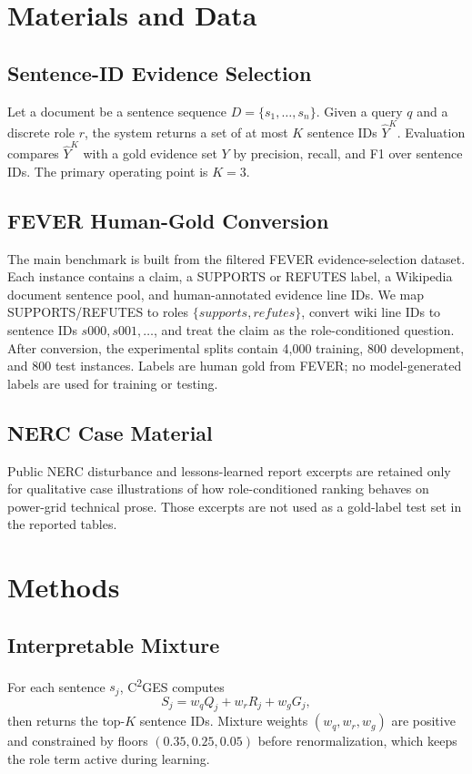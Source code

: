 \documentclass[applsci,article,submit,moreauthors]{Definitions/mdpi}
\newcommand{\cges}{C\textsuperscript{2}GES}
\begin{document}
\section{Materials and Data}
\label{sec:task_benchmark}

\subsection{Sentence-ID Evidence Selection}
Let a document be a sentence sequence $D=\{s_1,\ldots,s_n\}$. Given a query $q$ and a discrete role $r$, the system returns a set of at most $K$ sentence IDs $\hat{Y}^{K}$. Evaluation compares $\hat{Y}^{K}$ with a gold evidence set $Y$ by precision, recall, and F1 over sentence IDs. The primary operating point is $K=3$.

\subsection{FEVER Human-Gold Conversion}
The main benchmark is built from the filtered FEVER evidence-selection dataset. Each instance contains a claim, a SUPPORTS or REFUTES label, a Wikipedia document sentence pool, and human-annotated evidence line IDs. We map SUPPORTS/REFUTES to roles $\{supports,refutes\}$, convert wiki line IDs to sentence IDs $s000,s001,\ldots$, and treat the claim as the role-conditioned question. After conversion, the experimental splits contain 4{,}000 training, 800 development, and 800 test instances. Labels are human gold from FEVER; no model-generated labels are used for training or testing.

\subsection{NERC Case Material}
Public NERC disturbance and lessons-learned report excerpts are retained only for qualitative case illustrations of how role-conditioned ranking behaves on power-grid technical prose. Those excerpts are not used as a gold-label test set in the reported tables.

\section{Methods}
\label{sec:method}

\subsection{Interpretable Mixture}
For each sentence $s_j$, \cges{} computes
\begin{equation}
S_j = w_q Q_j + w_r R_j + w_g G_j,
\end{equation}
then returns the top-$K$ sentence IDs. Mixture weights $(w_q,w_r,w_g)$ are positive and constrained by floors $(0.35,0.25,0.05)$ before renormalization, which keeps the role term active during learning.
\end{document}
